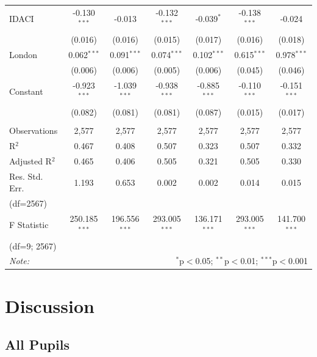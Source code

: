 \documentclass[12pt, a4paper]{article}
\begin{document}
\begin{table}
\begin{tabular}{@{\extracolsep{5pt}}lcccccc}
 IDACI & -0.130$^{***}$ & -0.013 & -0.132$^{***}$ & -0.039$^{*}$ & -0.138$^{***}$ & -0.024 \\ 
 & (0.016) & (0.016) & (0.015) & (0.017) & (0.016) & (0.018) \\ 
 London & 0.062$^{***}$ & 0.091$^{***}$ & 0.074$^{***}$ & 0.102$^{***}$ & 0.615$^{***}$ & 0.978$^{***}$ \\ 
 & (0.006) & (0.006) & (0.005) & (0.006) & (0.045) & (0.046) \\ 
 Constant & -0.923$^{***}$ & -1.039$^{***}$ & -0.938$^{***}$ & -0.885$^{***}$ & -0.110$^{***}$ & -0.151$^{***}$ \\ 
 & (0.082) & (0.081) & (0.081) & (0.087) & (0.015) & (0.017) \\ 
 \hline \\[-1.8ex] 
Observations & 2,577 & 2,577 & 2,577 & 2,577 & 2,577 & 2,577 \\ 
R$^{2}$ & 0.467 & 0.408 & 0.507 & 0.323 & 0.507 & 0.332 \\ 
Adjusted R$^{2}$ & 0.465 & 0.406 & 0.505 & 0.321 & 0.505 & 0.330 \\ 
Res. Std. Err. & 1.193 & 0.653 & 0.002 & 0.002 & 0.014 & 0.015 \\ 
 (df=2567) & & & & & &\\ 
F Statistic & 250.185$^{***}$ & 196.556$^{***}$ & 293.005$^{***}$ & 136.171$^{***}$ & 293.005$^{***}$ & 141.700$^{***}$ \\ 
(df=9; 2567) & & & & & &\\ 
\hline 
\textit{Note:} & \multicolumn{6}{r}{$^{*}$p$<$0.05; $^{**}$p$<$0.01; $^{***}$p$<$0.001} \\ 
\end{tabular}
\end{table} 

\section{Discussion}

\subsection{All Pupils}
\end{document}
